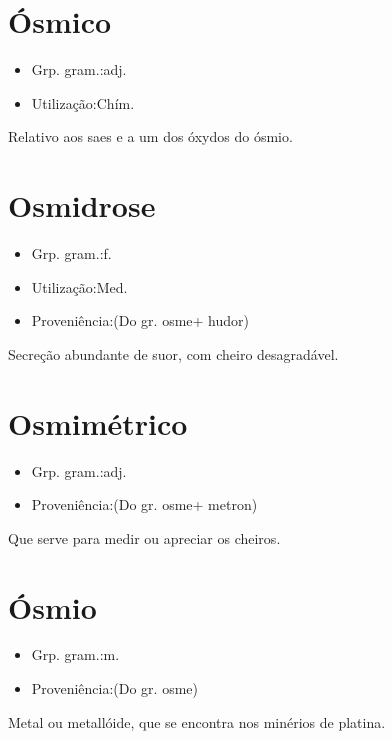 \section{Ósmico}
\begin{itemize}
\item {Grp. gram.:adj.}
\end{itemize}
\begin{itemize}
\item {Utilização:Chím.}
\end{itemize}
Relativo aos saes e a um dos óxydos do ósmio.
\section{Osmidrose}
\begin{itemize}
\item {Grp. gram.:f.}
\end{itemize}
\begin{itemize}
\item {Utilização:Med.}
\end{itemize}
\begin{itemize}
\item {Proveniência:(Do gr. \textunderscore osme\textunderscore  + \textunderscore hudor\textunderscore )}
\end{itemize}
Secreção abundante de suor, com cheiro desagradável.
\section{Osmimétrico}
\begin{itemize}
\item {Grp. gram.:adj.}
\end{itemize}
\begin{itemize}
\item {Proveniência:(Do gr. \textunderscore osme\textunderscore  + \textunderscore metron\textunderscore )}
\end{itemize}
Que serve para medir ou apreciar os cheiros.
\section{Ósmio}
\begin{itemize}
\item {Grp. gram.:m.}
\end{itemize}
\begin{itemize}
\item {Proveniência:(Do gr. \textunderscore osme\textunderscore )}
\end{itemize}
Metal ou metallóide, que se encontra nos minérios de platina.
